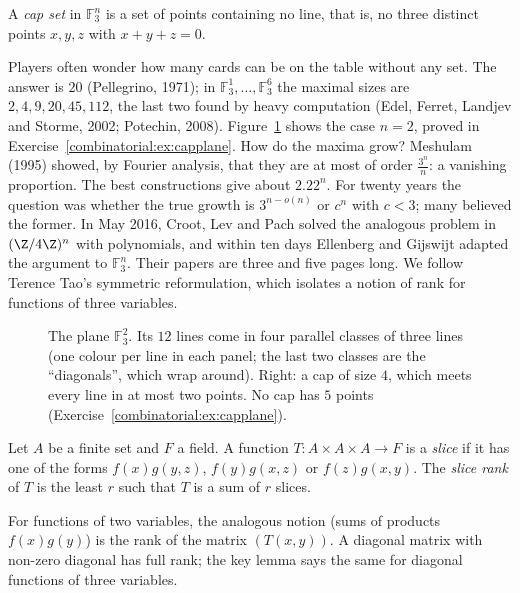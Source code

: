 \begin{definition}\label{combinatorial:def:cap}
A \emph{cap set} in $\mathbb F_3^n$ is a set of points containing no line, that is, no three distinct points $x,y,z$ with $x+y+z=0$.
\end{definition}

Players often wonder how many cards can be on the table without any set. The answer is $20$ (Pellegrino, 1971); in $\mathbb F_3^1,\dots,\mathbb F_3^6$ the maximal sizes are $2,4,9,20,45,112$, the last two found by
heavy computation (Edel, Ferret, Landjev and Storme, 2002; Potechin, 2008). Figure~\ref{combinatorial:fig:caps} shows the case $n=2$, proved in Exercise~\ref{combinatorial:ex:capplane}. How do the maxima grow? Meshulam (1995) showed, by
Fourier analysis, that they are at most of order $\frac{3^n}n$: a vanishing proportion. The best constructions give about $2.22^n$. For twenty years the question was whether the true growth is $3^{n-o(n)}$ or
$c^n$ with $c<3$; many believed the former. In May 2016, Croot, Lev and Pach solved the analogous problem in $(\Z/4\Z)^n$ with polynomials, and within ten days Ellenberg and Gijswijt adapted the argument to
$\mathbb F_3^n$. Their papers are three and five pages long. We follow Terence Tao's symmetric reformulation, which isolates a notion of rank for functions of three variables.

\begin{figure}[ht]
\centering
{}
\caption{The plane $\mathbb F_3^2$. Its $12$ lines come in four parallel classes of three lines (one colour per line in each panel; the last two classes are the ``diagonals'', which wrap around). Right: a cap of
size $4$, which meets every line in at most two points. No cap has $5$ points (Exercise~\ref{combinatorial:ex:capplane}).}
\label{combinatorial:fig:caps}
\end{figure}

\begin{definition}\label{combinatorial:def:slicerank}
Let $A$ be a finite set and $F$ a field. A function $T:A\times A\times A\to F$ is a \emph{slice} if it has one of the forms $f(x)g(y,z)$, $f(y)g(x,z)$ or $f(z)g(x,y)$. The \emph{slice rank} of $T$ is the least $r$ such
that $T$ is a sum of $r$ slices.
\end{definition}

For functions of two variables, the analogous notion (sums of products $f(x)g(y)$) is the rank of the matrix $(T(x,y))$. A diagonal matrix with non-zero diagonal has full rank; the key lemma says the same for
diagonal functions of three variables.

